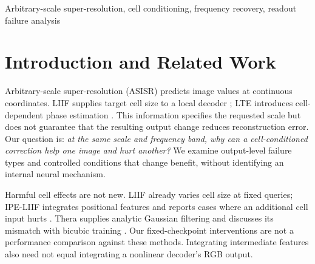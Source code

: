 \begin{abstract}
Relative to zero cell, native target-cell conditioning in arbitrary-scale
super-resolution improves average quality but need not improve every image
or frequency band. We diagnose
this discrepancy through fixed-checkpoint corrections, separating amplitude
overshoot from wrong-direction changes using an exact squared-error identity.
A prospective replication on 32 natural images, two model families and two
training seeds finds harmful corrections against both zero and nonzero cell
references. Relative to zero cell, native conditioning improves mean PSNR
in all four model--scale groups, yet uniform half-correction increases mean
RGB MSE by 0.26--7.55\%. Nonzero references reveal additional failures and
change which images are labelled harmful: failure is a property of a specified
correction, not an intrinsic image label. Controlled high-frequency input
paths and equal-power phase changes further produce opposite gains at fixed
scale. Together, these measurements explain why average frequency ordering,
local band damage and successful rescue of selected cases are insufficient
criteria for a globally beneficial readout correction.
\end{abstract}
\begin{keywords}
Arbitrary-scale super-resolution, cell conditioning, frequency recovery,
readout failure analysis
\end{keywords}

\section{Introduction and Related Work}
\label{sec:intro}
Arbitrary-scale super-resolution (ASISR) predicts image values at continuous
coordinates. LIIF supplies target cell size to a local decoder
\cite{chen2021liif}; LTE introduces cell-dependent phase estimation
\cite{lee2022lte}. This information specifies the requested scale but does
not guarantee that the resulting output change reduces reconstruction
error. Our question is: \emph{at the same scale and frequency band, why
can a cell-conditioned correction help one image and hurt another?}
We examine output-level failure types and controlled conditions that
change benefit, without identifying an internal neural mechanism.

Harmful cell effects are not new. LIIF already varies cell size at fixed
queries; IPE-LIIF integrates positional features and reports cases where
an additional cell input hurts \cite{liu2021ipe}. Thera supplies analytic
Gaussian filtering and discusses its mismatch with bicubic training
\cite{becker2025thera}. Our fixed-checkpoint interventions are not a
performance comparison against these methods. Integrating intermediate
features also need not equal integrating a nonlinear decoder's RGB output.

